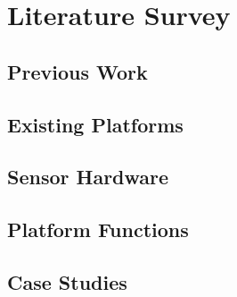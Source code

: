 \chapter{Literature Survey}
  \section{Previous Work}
  \section{Existing Platforms}
  \section{Sensor Hardware}
  \section{Platform Functions}
  \section{Case Studies}